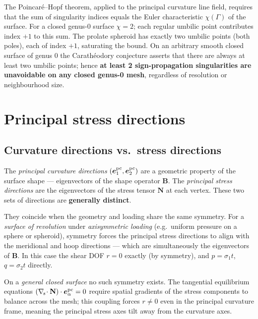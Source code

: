\documentclass[11pt]{article}
\newcommand{\vv}[1]{\bm{#1}}          %
\newcommand{\Nb}{\mathbf{N}}           %
\newcommand{\divs}{\nabla_{\!s}\!\cdot}
\begin{document}
The Poincaré--Hopf theorem, applied to the principal curvature line field,
requires that the sum of singularity indices equals the Euler characteristic
$\chi(\Gamma)$ of the surface.  For a closed genus-0 surface
$\chi=2$; each regular umbilic point contributes index $+1$ to this sum.  The
prolate spheroid has exactly two umbilic points (both poles), each of index
$+1$, saturating the bound.  On an arbitrary smooth closed surface of genus 0
the Carath\'eodory conjecture asserts that there are always at least two
umbilic points; hence \textbf{at least 2 sign-propagation singularities are
unavoidable on any closed genus-0 mesh}, regardless of resolution or
neighbourhood size.

\section{Principal stress directions}
\label{sec:stress-dirs}

\subsection{Curvature directions vs.\ stress directions}

The \emph{principal curvature directions} $(\vv{e}_1^{\rm pc},\vv{e}_2^{\rm pc})$
are a geometric property of the surface shape — eigenvectors of the shape
operator $\mathbf{B}$.  The \emph{principal stress directions} are the
eigenvectors of the stress tensor $\Nb$ at each vertex.  These two sets of
directions are \textbf{generally distinct}.

They coincide when the geometry and loading share the same symmetry.  For a
\emph{surface of revolution} under \emph{axisymmetric loading} (e.g.\ uniform
pressure on a sphere or spheroid), symmetry forces the principal stress
directions to align with the meridional and hoop directions — which are
simultaneously the eigenvectors of $\mathbf{B}$.  In this case the shear DOF
$r=0$ exactly (by symmetry), and $p=\sigma_1 t$, $q=\sigma_2 t$ directly.

On a \emph{general closed surface} no such symmetry exists.  The tangential
equilibrium equations $(\divs\Nb)\cdot\vv{e}_\alpha^{\rm pc}=0$ require
spatial gradients of the stress components to balance across the mesh; this
coupling forces $r\ne 0$ even in the principal curvature frame, meaning the
principal stress axes tilt away from the curvature axes.
\end{document}
